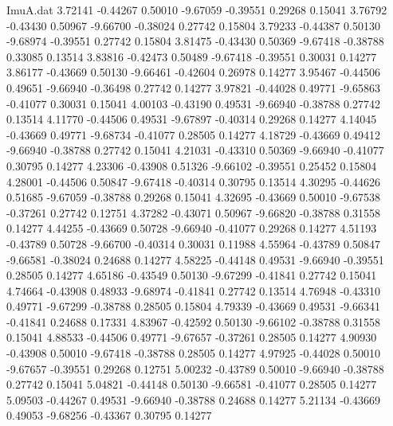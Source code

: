 \begin{filecontents}{ImuA.dat}
   3.72141   -0.44267    0.50010   -9.67059   -0.39551    0.29268    0.15041
   3.76792   -0.43430    0.50967   -9.66700   -0.38024    0.27742    0.15804
   3.79233   -0.44387    0.50130   -9.68974   -0.39551    0.27742    0.15804
   3.81475   -0.43430    0.50369   -9.67418   -0.38788    0.33085    0.13514
   3.83816   -0.42473    0.50489   -9.67418   -0.39551    0.30031    0.14277
   3.86177   -0.43669    0.50130   -9.66461   -0.42604    0.26978    0.14277
   3.95467   -0.44506    0.49651   -9.66940   -0.36498    0.27742    0.14277
   3.97821   -0.44028    0.49771   -9.65863   -0.41077    0.30031    0.15041
   4.00103   -0.43190    0.49531   -9.66940   -0.38788    0.27742    0.13514
   4.11770   -0.44506    0.49531   -9.67897   -0.40314    0.29268    0.14277
   4.14045   -0.43669    0.49771   -9.68734   -0.41077    0.28505    0.14277
   4.18729   -0.43669    0.49412   -9.66940   -0.38788    0.27742    0.15041
   4.21031   -0.43310    0.50369   -9.66940   -0.41077    0.30795    0.14277
   4.23306   -0.43908    0.51326   -9.66102   -0.39551    0.25452    0.15804
   4.28001   -0.44506    0.50847   -9.67418   -0.40314    0.30795    0.13514
   4.30295   -0.44626    0.51685   -9.67059   -0.38788    0.29268    0.15041
   4.32695   -0.43669    0.50010   -9.67538   -0.37261    0.27742    0.12751
   4.37282   -0.43071    0.50967   -9.66820   -0.38788    0.31558    0.14277
   4.44255   -0.43669    0.50728   -9.66940   -0.41077    0.29268    0.14277
   4.51193   -0.43789    0.50728   -9.66700   -0.40314    0.30031    0.11988
   4.55964   -0.43789    0.50847   -9.66581   -0.38024    0.24688    0.14277
   4.58225   -0.44148    0.49531   -9.66940   -0.39551    0.28505    0.14277
   4.65186   -0.43549    0.50130   -9.67299   -0.41841    0.27742    0.15041
   4.74664   -0.43908    0.48933   -9.68974   -0.41841    0.27742    0.13514
   4.76948   -0.43310    0.49771   -9.67299   -0.38788    0.28505    0.15804
   4.79339   -0.43669    0.49531   -9.66341   -0.41841    0.24688    0.17331
   4.83967   -0.42592    0.50130   -9.66102   -0.38788    0.31558    0.15041
   4.88533   -0.44506    0.49771   -9.67657   -0.37261    0.28505    0.14277
   4.90930   -0.43908    0.50010   -9.67418   -0.38788    0.28505    0.14277
   4.97925   -0.44028    0.50010   -9.67657   -0.39551    0.29268    0.12751
   5.00232   -0.43789    0.50010   -9.66940   -0.38788    0.27742    0.15041
   5.04821   -0.44148    0.50130   -9.66581   -0.41077    0.28505    0.14277
   5.09503   -0.44267    0.49531   -9.66940   -0.38788    0.24688    0.14277
   5.21134   -0.43669    0.49053   -9.68256   -0.43367    0.30795    0.14277

\end{filecontents}
